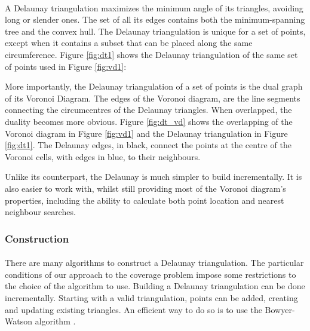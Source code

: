 \paragraph{}
A Delaunay triangulation maximizes the minimum angle of its triangles, avoiding long or slender ones.
The set of all its edges contains both the minimum-spanning tree and the convex hull.
The Delaunay triangulation is unique for a set of points, except when it contains a subset that can be placed along the same circumference. Figure \ref{fig:dt1} shows the Delaunay triangulation of the same set of points used in Figure \ref{fig:vd1}:

\noindent
More importantly, the Delaunay triangulation of a set of points is the dual graph of its Voronoi Diagram. The edges of the Voronoi diagram, are the line segments connecting the circumcentres of the Delaunay triangles. When overlapped, the duality becomes more obvious. Figure \ref{fig:dt_vd} shows the overlapping of the Voronoi diagram in Figure \ref{fig:vd1} and the Delaunay  triangulation in Figure \ref{fig:dt1}. The Delaunay edges, in black, connect the points at the centre of the Voronoi cells, with edges in blue, to their neighbours.

\noindent
Unlike its counterpart, the Delaunay is much simpler to build incrementally. It is also easier to work with, whilst still providing most of the Voronoi diagram's properties, including the ability to calculate both point location and nearest neighbour searches.
\subsubsection*{Construction}
\label{sect:dtconst}
\paragraph{}
There are many algorithms to construct a Delaunay triangulation. 
The particular conditions of our approach to the coverage problem impose some restrictions to the choice of the algorithm to use.
Building a Delaunay triangulation can be done incrementally. Starting with a valid triangulation, points can be added, creating and updating existing triangles. An efficient way to do so is to use the Bowyer-Watson algorithm \cite{bwalgo}.
